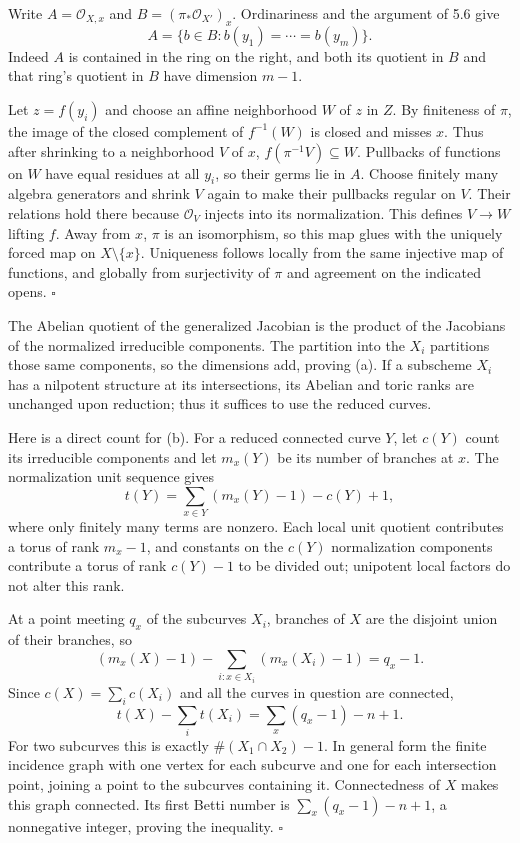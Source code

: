 \documentclass[11pt]{article}
\let\chapterexercise\exercise
\renewcommand{\exercise}[2]{\Needspace{8\baselineskip}\chapterexercise{#1}{#2}}
\begin{document}
\pf
Write $A=\mathcal O_{X,x}$ and $B=(\pi_*\mathcal O_{X'})_x$. Ordinariness and the argument of 5.6 give
\[ A=\{b\in B:b(y_1)=\cdots=b(y_m)\}. \]
Indeed $A$ is contained in the ring on the right, and both its quotient in $B$ and that ring's quotient in $B$ have dimension $m-1$.

Let $z=f(y_i)$ and choose an affine neighborhood $W$ of $z$ in $Z$. By finiteness of $\pi$, the image of the closed complement of $f^{-1}(W)$ is closed and misses $x$. Thus after shrinking to a neighborhood $V$ of $x$, $f(\pi^{-1}V)\subseteq W$. Pullbacks of functions on $W$ have equal residues at all $y_i$, so their germs lie in $A$. Choose finitely many algebra generators and shrink $V$ again to make their pullbacks regular on $V$. Their relations hold there because $\mathcal O_V$ injects into its normalization. This defines $V\to W$ lifting $f$. Away from $x$, $\pi$ is an isomorphism, so this map glues with the uniquely forced map on $X\setminus\{x\}$. Uniqueness follows locally from the same injective map of functions, and globally from surjectivity of $\pi$ and agreement on the indicated opens. \hfill$\square$

\pf
The Abelian quotient of the generalized Jacobian is the product of the Jacobians of the normalized irreducible components. The partition into the $X_i$ partitions those same components, so the dimensions add, proving (a). If a subscheme $X_i$ has a nilpotent structure at its intersections, its Abelian and toric ranks are unchanged upon reduction; thus it suffices to use the reduced curves.

Here is a direct count for (b). For a reduced connected curve $Y$, let $c(Y)$ count its irreducible components and let $m_x(Y)$ be its number of branches at $x$. The normalization unit sequence gives
\[ t(Y)=\sum_{x\in Y}(m_x(Y)-1)-c(Y)+1, \]
where only finitely many terms are nonzero. Each local unit quotient contributes a torus of rank $m_x-1$, and constants on the $c(Y)$ normalization components contribute a torus of rank $c(Y)-1$ to be divided out; unipotent local factors do not alter this rank.

At a point meeting $q_x$ of the subcurves $X_i$, branches of $X$ are the disjoint union of their branches, so
\[ (m_x(X)-1)-\sum_{i:x\in X_i}(m_x(X_i)-1)=q_x-1. \]
Since $c(X)=\sum_i c(X_i)$ and all the curves in question are connected,
\[ t(X)-\sum_i t(X_i)=\sum_x(q_x-1)-n+1. \]
For two subcurves this is exactly $\#(X_1\cap X_2)-1$. In general form the finite incidence graph with one vertex for each subcurve and one for each intersection point, joining a point to the subcurves containing it. Connectedness of $X$ makes this graph connected. Its first Betti number is $\sum_x(q_x-1)-n+1$, a nonnegative integer, proving the inequality. \hfill$\square$
\end{document}
